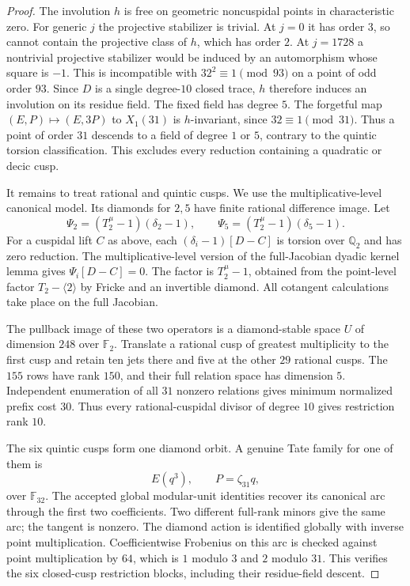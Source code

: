 \begin{proof}
The involution $h$ is free on geometric noncuspidal points in
characteristic zero. For generic $j$ the projective stabilizer is
trivial. At $j=0$ it has order $3$, so cannot contain the projective
class of $h$, which has order $2$. At $j=1728$ a nontrivial projective
stabilizer would be induced by an automorphism whose square is $-1$.
This is incompatible with $32^2\equiv1\pmod{93}$ on a point of odd
order $93$.
Since $D$ is a single degree-$10$ closed trace, $h$ therefore induces
an involution on its residue field. The fixed field has degree $5$.
The forgetful map $(E,P)\mapsto(E,3P)$ to $X_1(31)$ is $h$-invariant,
since $32\equiv1\pmod{31}$. Thus a point of order $31$ descends to
a field of degree $1$ or $5$, contrary to the quintic torsion
classification. This excludes every reduction containing a
quadratic or decic cusp.

It remains to treat rational and quintic cusps. We use the
multiplicative-level canonical model. Its diamonds for $2,5$ have
finite rational difference image. Let
\[
 \Psi_2=(T_2^\mu-1)(\delta_2-1),\qquad
 \Psi_5=(T_2^\mu-1)(\delta_5-1).
\]
For a cuspidal lift $C$ as above, each $(\delta_i-1)[D-C]$ is torsion
over $\mathbb Q_2$ and has zero reduction. The multiplicative-level
version of the full-Jacobian dyadic kernel lemma gives
$\Psi_i[D-C]=0$. The factor is $T_2^\mu-1$, obtained from the
point-level factor $T_2-\langle2\rangle$ by Fricke and an invertible
diamond. All cotangent calculations take place on the full Jacobian.

The pullback image of these two operators is a diamond-stable space
$U$ of dimension $248$ over $\mathbb F_2$. Translate a rational cusp
of greatest multiplicity to the first cusp and retain ten jets there
and five at the other $29$ rational cusps. The $155$ rows have rank
$150$, and their full relation space has dimension $5$. Independent
enumeration of all $31$ nonzero relations gives minimum normalized
prefix cost $30$. Thus every rational-cuspidal divisor of degree
$10$ gives restriction rank $10$.

The six quintic cusps form one diamond orbit. A genuine Tate family
for one of them is
\[
                 E(q^3),\qquad P=\zeta_{31}q,
\]
over $\mathbb F_{32}$. The accepted global modular-unit identities
recover its canonical arc through the first two coefficients.
Two different full-rank minors give the same arc; the tangent is
nonzero. The diamond action is identified globally with inverse
point multiplication. Coefficientwise Frobenius on this arc is
checked against point multiplication by $64$, which is $1$ modulo
$3$ and $2$ modulo $31$. This verifies the six closed-cusp restriction
blocks, including their residue-field descent.


\end{proof}
